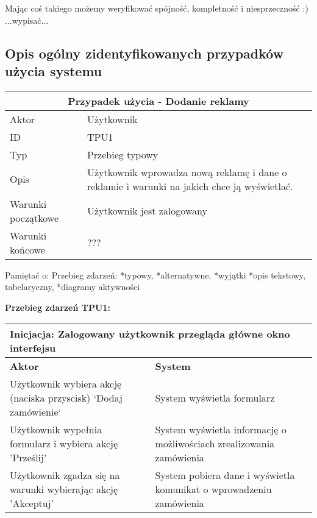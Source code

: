 \documentclass[10pt,a4paper,titlepage]{article} %
\begin{document}
		Mając coś takiego możemy weryfikować spójność, kompletność i niesprzeczność :)\newline
		...wypisać...\newline

		\subsection{Opis ogólny zidentyfikowanych przypadków użycia systemu}

		\begin {center}
		\begin{tabular}{|l|p{10cm}|}
		  \hline
		  \multicolumn{2}{|c|}{\bf Przypadek użycia - Dodanie reklamy}\\\hline
		  \hline
		  Aktor & Użytkownik \\ \hline
		  ID & TPU1 \\ \hline
		  Typ & Przebieg typowy \\ \hline
		  Opis & Użytkownik wprowadza nową reklamę i dane o reklamie i warunki na jakich chce ją wyświetlać. \\ \hline
		  Warunki początkowe & Użytkownik jest zalogowany \\ \hline
		  Warunki końcowe & ??? \\
		  \hline
		\end{tabular}
		\end{center}

		Pamiętać o:\newline
		Przebieg zdarzeń:\newline
		*typowy,\newline
		*alternatywne,\newline
		*wyjątki\newline
		*opis tekstowy, tabelaryczny,\newline
		*diagramy aktywności\newline

		\begin {center}
		{\bf Przebieg zdarzeń TPU1:}\newline
		\begin{tabular}{|p{6cm}|p{6cm}|}
		  \hline
		  \multicolumn{2}{|l|}{Inicjacja: Zalogowany użytkownik przegląda główne okno interfejsu}\\\hline
		  \hline
		  {\bf Aktor} & {\bf System }\\ \hline
		  \hline \hline
		  Użytkownik wybiera akcję (naciska przyscisk) `Dodaj zamówienie` & System wyświetla formularz \\ \hline
		  Użytkownik wypełnia formularz i wybiera akcję 'Prześlij' & System wyświetla informację o możliwościach zrealizowania zamówienia\\ \hline
		  Użytkownik zgadza się na warunki wybierając akcję 'Akceptuj' & System pobiera dane i wyświetla komunikat o wprowadzeniu zamówienia \\
		  \hline
		\end{tabular}
		\end{center}
		
\end{document}

